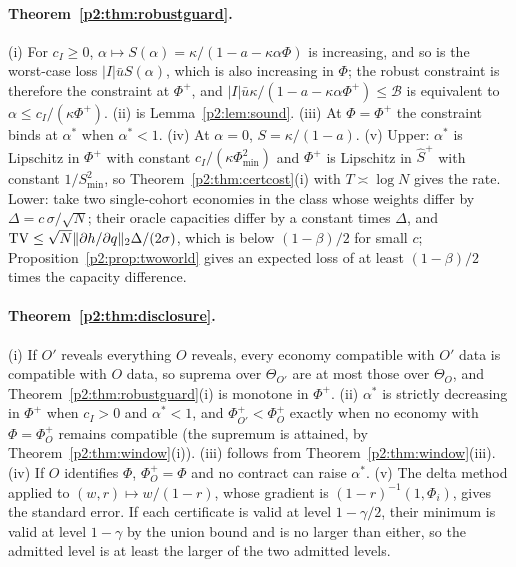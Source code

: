 \paragraph{Theorem~\ref{p2:thm:robustguard}.} (i) For $c_I\ge0$, $\alpha\mapsto S(\alpha)=\kappa/(1-a-\kappa\alpha\Phi)$ is increasing, and so is the worst-case loss $|I|\bar uS(\alpha)$, which is also increasing in $\Phi$; the robust constraint is therefore the constraint at $\Phi^+$, and $|I|\bar u\kappa/(1-a-\kappa\alpha\Phi^+)\le\mathcal B$ is equivalent to $\alpha\le c_I/(\kappa\Phi^+)$. (ii) is Lemma~\ref{p2:lem:sound}. (iii) At $\Phi=\Phi^+$ the constraint binds at $\alpha^*$ when $\alpha^*<1$. (iv) At $\alpha=0$, $S=\kappa/(1-a)$. (v) Upper: $\alpha^*$ is Lipschitz in $\Phi^+$ with constant $c_I/(\kappa\Phi_{\min}^2)$ and $\Phi^+$ is Lipschitz in $\hat S^+$ with constant $1/S_{\min}^2$, so Theorem~\ref{p2:thm:certcost}(i) with $T\asymp\log N$ gives the rate. Lower: take two single-cohort economies in the class whose weights differ by $\Delta=c\,\sigma/\sqrt N$; their oracle capacities differ by a constant times $\Delta$, and ${\rm TV}\le\sqrt N\|\partial h/\partial q\|_2\Delta/(2\sigma)$, which is below $(1-\beta)/2$ for small $c$; Proposition~\ref{p2:prop:twoworld} gives an expected loss of at least $(1-\beta)/2$ times the capacity difference.

\paragraph{Theorem~\ref{p2:thm:disclosure}.} (i) If $O'$ reveals everything $O$ reveals, every economy compatible with $O'$ data is compatible with $O$ data, so suprema over $\Theta_{O'}$ are at most those over $\Theta_O$, and Theorem~\ref{p2:thm:robustguard}(i) is monotone in $\Phi^+$. (ii) $\alpha^*$ is strictly decreasing in $\Phi^+$ when $c_I>0$ and $\alpha^*<1$, and $\Phi^+_{O'}<\Phi^+_O$ exactly when no economy with $\Phi=\Phi^+_O$ remains compatible (the supremum is attained, by Theorem~\ref{p2:thm:window}(i)). (iii) follows from Theorem~\ref{p2:thm:window}(iii). (iv) If $O$ identifies $\Phi$, $\Phi^+_O=\Phi$ and no contract can raise $\alpha^*$. (v) The delta method applied to $(w,r)\mapsto w/(1-r)$, whose gradient is $(1-r)^{-1}(1,\Phi_i)$, gives the standard error. If each certificate is valid at level $1-\gamma/2$, their minimum is valid at level $1-\gamma$ by the union bound and is no larger than either, so the admitted level is at least the larger of the two admitted levels.

